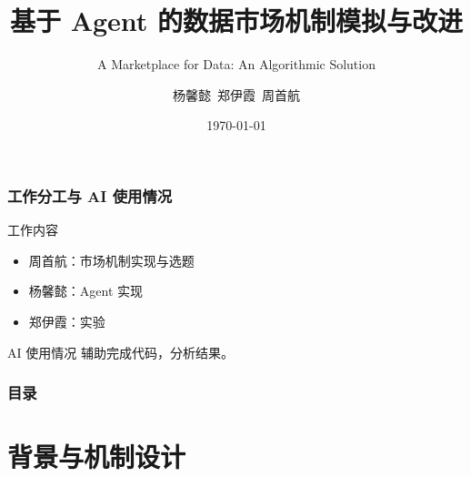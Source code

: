 \documentclass[10pt,aspectratio=169]{beamer}
\title[数据市场 Agent 模拟]{基于 Agent 的数据市场机制模拟与改进}
\subtitle{A Marketplace for Data: An Algorithmic Solution}
\author[]{杨馨懿\ 郑伊霞\ 周首航}
\date{\today}
\begin{document}
\begin{frame}
	\titlepage
\end{frame}

\begin{frame}
	\frametitle{工作分工与 AI 使用情况}

	\begin{block}{工作内容}
		\begin{itemize}
			\item 周首航：市场机制实现与选题
			\item 杨馨懿：Agent 实现
			\item 郑伊霞：实验
		\end{itemize}
	\end{block}

	\begin{block}{AI 使用情况}
		辅助完成代码，分析结果。
	\end{block}
\end{frame}

\begin{frame}
	\frametitle{目录}
	\tableofcontents
\end{frame}

\section{背景与机制设计}
\end{document}
